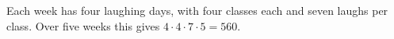 Each week has four laughing days, with four classes each and seven laughs per class. Over five weeks this gives $4\cdot4\cdot7\cdot5=\boxed{560}$.
